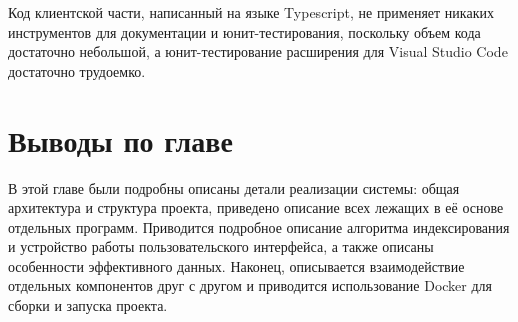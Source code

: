 Код клиентской части, написанный на языке Typescript, не применяет никаких инструментов для документации и юнит-тестирования, поскольку объем кода достаточно небольшой, а юнит-тестирование расширения для Visual Studio Code достаточно трудоемко.

\section{Выводы по главе}

В этой главе были подробны описаны детали реализации системы: общая архитектура и структура проекта, приведено описание всех лежащих в её основе отдельных программ. Приводится подробное описание алгоритма индексирования и устройство работы пользовательского интерфейса, а также описаны особенности эффективного данных. Наконец, описывается взаимодействие отдельных компонентов друг с другом и приводится использование Docker для сборки и запуска проекта.

\clearpage
